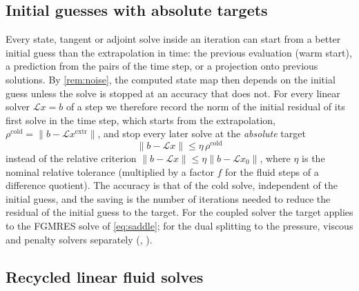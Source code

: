 \documentclass[11pt,a4paper]{article}
\theoremstyle{definition}
\theoremstyle{remark}
\begin{document}
\subsection{Initial guesses with absolute targets}\label{sec:absolute_target}

Every state, tangent or adjoint solve inside an iteration can start from a better initial guess
than the extrapolation in time: the previous evaluation (warm start), a prediction from the pairs of
the time step, or a projection onto previous solutions. By \cref{rem:noise}, the computed state
map then depends on the initial guess unless the solve is stopped at an accuracy that does not.
For every linear solver $\mathcal L x=b$ of a step we therefore record the norm of the initial
residual of its first solve in the time step, which starts from the extrapolation,
$\rho^{\mathrm{cold}}=\|b-\mathcal Lx^{\mathrm{extr}}\|$, and stop every later solve at the
\emph{absolute} target
\begin{equation}\label{eq:absolute_target}
  \|b-\mathcal Lx\|\le\eta\,\rho^{\mathrm{cold}}
\end{equation}
instead of the relative criterion $\|b-\mathcal Lx\|\le\eta\|b-\mathcal Lx_0\|$, where $\eta$ is the
nominal relative tolerance (multiplied by a factor $f$ for the fluid steps of a difference
quotient). The accuracy is that of the cold solve, independent of the initial guess, and the
saving is the number of iterations needed to reduce the residual of the initial guess to the
target. For the coupled solver the target applies to the FGMRES solve of \eqref{eq:saddle}; for the
dual splitting to the pressure, viscous and penalty solvers separately
(, ).

\subsection{Recycled linear fluid solves}\label{sec:recycling}
\end{document}
